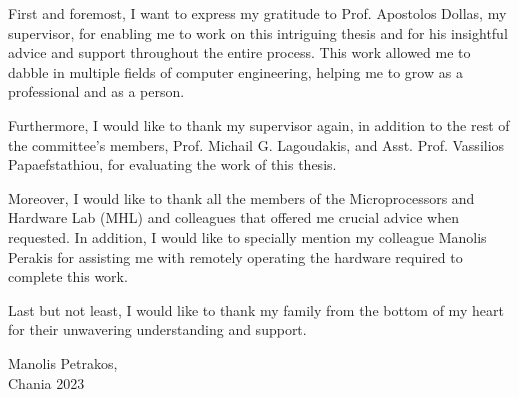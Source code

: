\documentclass[
	12pt, %
	english,
	onehalfspacing, %
	liststotoc, %
	toctotoc, %
	parskip, %
	headsepline, %
]{MastersDoctoralThesis} %
\begin{document}
\begin{acknowledgements}
	\addchaptertocentry{\acknowledgementname} %
    First and foremost, I want to express my gratitude to Prof. Apostolos Dollas, my supervisor, for enabling me to work on this intriguing thesis and for his insightful advice and support throughout the entire process. This work allowed me to dabble in multiple fields of computer engineering, helping me to grow as a professional and as a person.
    
    Furthermore, I would like to thank my supervisor again, in addition to the rest of the committee's members, Prof. Michail G. Lagoudakis, and Asst. Prof. Vassilios Papaefstathiou, for evaluating the work of this thesis.

    Moreover, I would like to thank all the members of the Microprocessors and Hardware Lab (MHL) and colleagues that offered me crucial advice when requested. In addition, I would like to specially mention my colleague Manolis Perakis for assisting me with remotely operating the hardware required to complete this work.

    Last but not least, I would like to thank my family from the bottom of my heart for their unwavering understanding and support.
    \\
\begin{flushright}
Manolis Petrakos,\\
Chania 2023
\end{flushright}
\end{acknowledgements}


\tableofcontents %
\listoffigures %
\listoftables %
\listofalgorithms %

\end{document}
